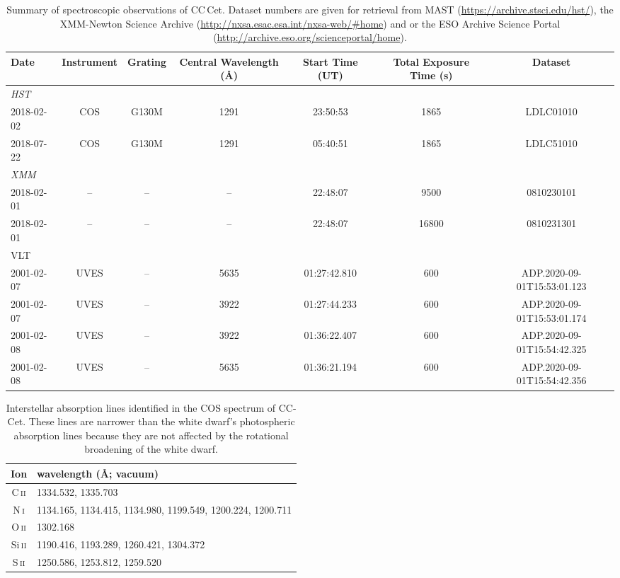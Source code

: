 \documentclass[fleqn,usenatbib]{mnras}
\newcommand{\Ion}[2]{#1{\,\textsc{#2}}}
\begin{document}
\begin{table}
\centering
\caption{Summary of spectroscopic observations of CC\,Cet. Dataset numbers are given for retrieval from MAST (\url{https://archive.stsci.edu/hst/}), the XMM-Newton Science Archive (\url{http://nxsa.esac.esa.int/nxsa-web/\#home}) and or the ESO Archive Science Portal (\url{http://archive.eso.org/scienceportal/home}).}  
\begin{tabular}{lcccccc}\\
\hline
Date & Instrument & Grating &  Central Wavelength (\AA) & Start Time (UT) & Total Exposure Time (s) & Dataset \\
\hline 
\textit{HST} & & & & & & \\
2018-02-02 & COS &	G130M &	1291 & 23:50:53 & 	1865 &	LDLC01010 \\
2018-07-22 & 	COS &	G130M &	1291	& 05:40:51 & 1865 &	LDLC51010\\
\textit{XMM} & & & & & & \\
2018-02-01 & -- & -- & -- & 22:48:07 & 9500 & 0810230101\\
2018-02-01 & -- & -- & -- & 22:48:07 & 16800 & 0810231301\\
VLT  & & & & & & \\
2001-02-07 & UVES & -- & 5635  & 01:27:42.810 & 600 & ADP.2020-09-01T15:53:01.123\\
2001-02-07 & UVES & -- & 3922 & 01:27:44.233 &600 & ADP.2020-09-01T15:53:01.174\\
2001-02-08 & UVES & -- & 3922 & 01:36:22.407 &600 & ADP.2020-09-01T15:54:42.325\\
2001-02-08 & UVES & -- & 5635 &01:36:21.194 & 600 & ADP.2020-09-01T15:54:42.356 \\
	


\hline

\hline
\end{tabular}
\label{tab:hst_obs}
\end{table}

\begin{table}
    \centering
    \caption{Interstellar absorption lines identified in the COS spectrum of CC-Cet. These lines are narrower than the white dwarf's photospheric absorption lines because they are not affected by the rotational broadening of the white dwarf.}
    \label{tab:ISlines}
    \begin{tabular}{c l}
        \hline \hline
        Ion & wavelength (\AA; vacuum) \\
        \hline
        \Ion{C}{ii}   & 1334.532, 1335.703\\
        \Ion{N}{i}    & 1134.165, 1134.415, 1134.980, 1199.549, 1200.224, 1200.711\\
        \Ion{O}{ii}   & 1302.168\\
        \Ion{Si}{ii}  & 1190.416, 1193.289, 1260.421, 1304.372\\
        \Ion{S}{ii}   & 1250.586, 1253.812, 1259.520\\
        \hline
    \end{tabular}
\end{table}
\end{document}

